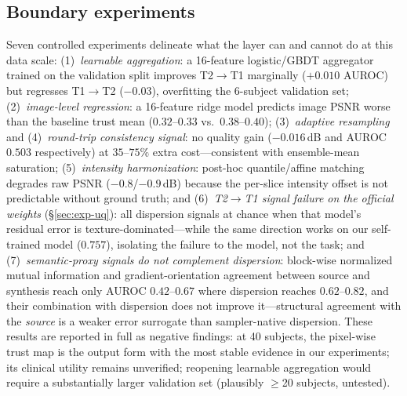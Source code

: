 \documentclass[11pt]{article}
\newcommand{\TrustMap}{trust map}
\begin{document}
\subsection{Boundary experiments}
Seven controlled experiments delineate what the layer can and cannot do at this
data scale:
(1)~\emph{learnable aggregation}: a 16-feature logistic/GBDT aggregator trained
on the validation split improves T2$\to$T1 marginally ($+0.010$ AUROC) but
regresses T1$\to$T2 ($-0.03$), overfitting the 6-subject validation set;
(2)~\emph{image-level regression}: a 16-feature ridge model predicts image
PSNR worse than the baseline trust mean ($0.32$--$0.33$ vs.\ $0.38$--$0.40$);
(3)~\emph{adaptive resampling} and (4)~\emph{round-trip consistency
signal}: no quality gain ($-0.016$\,dB and AUROC $0.503$ respectively) at
$35$--$75\%$ extra cost---consistent with ensemble-mean saturation;
(5)~\emph{intensity harmonization}: post-hoc quantile/affine matching degrades
raw PSNR ($-0.8$/$-0.9$\,dB) because the per-slice intensity offset is not
predictable without ground truth; and (6)~\emph{T2$\to$T1 signal failure on the official weights}
(\S\ref{sec:exp-uq}): all dispersion signals at chance when that model's
residual error is texture-dominated---while the same direction works on our
self-trained model ($0.757$), isolating the failure to the model, not the task; and (7)~\emph{semantic-proxy signals do not complement dispersion}:
block-wise normalized mutual information and gradient-orientation
agreement between source and synthesis reach only AUROC
$0.42$--$0.67$ where dispersion reaches $0.62$--$0.82$, and their
combination with dispersion does not improve it---structural
agreement with the \emph{source} is a weaker error surrogate than
sampler-native dispersion. These results are reported in full as negative findings:
at 40 subjects, the pixel-wise \TrustMap{} is the output form with the most
stable evidence in our experiments; its clinical utility remains unverified; reopening learnable aggregation would require a substantially larger
validation set (plausibly $\ge$20 subjects, untested).
\end{document}
